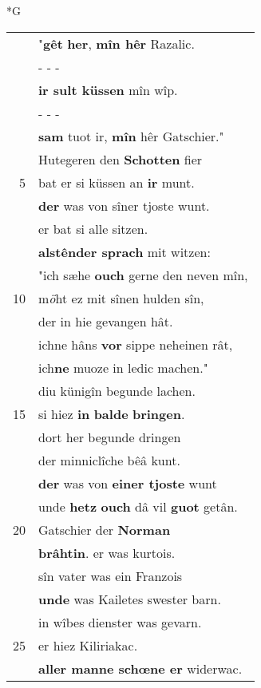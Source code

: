 \documentclass[8pt,a4paper,notitlepage]{article}
\begin{document}
\begin{table}[ht]
\begin{minipage}[t]{0.5\linewidth}
\small
\begin{center}*G
\end{center}
\begin{tabular}{rl}
 & "\textbf{gêt} \textbf{her}, \textbf{mîn hêr} Razalic.\\ 
 & \multicolumn{1}{l}{ - - - }\\ 
 & \textbf{ir sult küssen} mîn wîp.\\ 
 & \multicolumn{1}{l}{ - - - }\\ 
 & \textbf{sam} tuot ir, \textbf{mîn} hêr Gatschier."\\ 
 & Hutegeren den \textbf{Schotten} fier\\ 
5 & bat er si küssen an \textbf{ir} munt.\\ 
 & \textbf{der} was von sîner tjoste wunt.\\ 
 & er bat si alle sitzen.\\ 
 & \textbf{alstênde}\textbf{r sprach} mit witzen:\\ 
 & "ich sæhe \textbf{ouch} gerne den neven mîn,\\ 
10 & m\textit{ö}ht ez mit sînen hulden sîn,\\ 
 & der in hie gevangen hât.\\ 
 & ichne hâns \textbf{vor} sippe neheinen rât,\\ 
 & ich\textbf{ne} muoze in ledic machen."\\ 
 & diu künigîn begunde lachen.\\ 
15 & si hiez \textbf{in} \textbf{balde} \textbf{bringen}.\\ 
 & dort her begunde dringen\\ 
 & der minniclîche bêâ kunt.\\ 
 & \textbf{der} was von \textbf{einer tjoste} wunt\\ 
 & unde \textbf{hetz} \textbf{ouch} dâ vil \textbf{guot} getân.\\ 
20 & Gatschier der \textbf{Norman}\\ 
 & \textbf{brâhtin}. er was kurtois.\\ 
 & sîn vater was ein Franzois\\ 
 & \textbf{unde} was Kailetes swester barn.\\ 
 & in wîbes dienster was gevarn.\\ 
25 & er hiez Kiliriakac.\\ 
 & \textbf{aller manne schœne er} widerwac.\\ 

\end{tabular}
\end{minipage}
\end{table}
\end{document}
